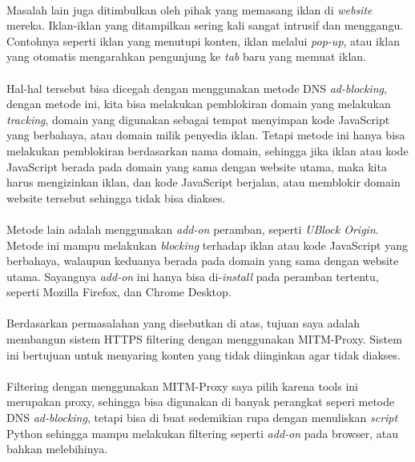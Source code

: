 \documentclass[a4paper,12pt]{article}
\begin{document}
  \paragraph*{}Masalah lain juga ditimbulkan oleh
  pihak yang memasang iklan di \textit{website} mereka.
  Iklan-iklan yang ditampilkan sering kali sangat intrusif
  dan menggangu. Contohnya seperti iklan yang menutupi
  konten, iklan melalui \textit{pop-up}, atau iklan yang
  otomatis mengarahkan pengunjung ke \textit{tab} baru yang
  memuat iklan.

  \paragraph*{}Hal-hal tersebut bisa dicegah dengan
  menggunakan metode DNS \textit{ad-blocking}, dengan metode
  ini, kita bisa melakukan pemblokiran domain yang melakukan
  \textit{tracking}, domain yang digunakan sebagai
  tempat menyimpan kode JavaScript yang berbahaya, atau
  domain milik penyedia iklan. Tetapi metode
  ini hanya bisa melakukan pemblokiran berdasarkan nama
  domain, sehingga jika iklan atau kode JavaScript berada
  pada domain yang sama dengan website utama, maka kita
  harus mengizinkan iklan, dan kode JavaScript berjalan,
  atau memblokir domain website tersebut sehingga tidak bisa
  diakses.

  \paragraph*{}Metode lain adalah menggunakan
  \textit{add-on} peramban, seperti \textit{UBlock Origin}.
  Metode ini mampu melakukan \textit{blocking} terhadap
  iklan atau kode JavaScript yang berbahaya, walaupun
  keduanya berada pada domain yang sama dengan website
  utama. Sayangnya \textit{add-on} ini hanya bisa
  di-\textit{install} pada peramban tertentu, seperti
  Mozilla Firefox, dan Chrome Desktop.

  \paragraph*{}Berdasarkan permasalahan yang disebutkan
  di atas, tujuan saya adalah membangun sistem HTTPS
  filtering dengan menggunakan MITM-Proxy. Sistem ini
  bertujuan untuk menyaring konten yang tidak diinginkan
  agar tidak diakses.

  \paragraph*{}Filtering dengan menggunakan MITM-Proxy saya
  pilih karena tools ini merupakan proxy, sehingga bisa
  digunakan di banyak perangkat seperi metode DNS
  \textit{ad-blocking}, tetapi bisa di buat sedemikian rupa
  dengan menuliskan \textit{script} Python sehingga mampu
  melakukan filtering seperti \textit{add-on} pada browser,
  atau bahkan melebihinya.
\end{document}
